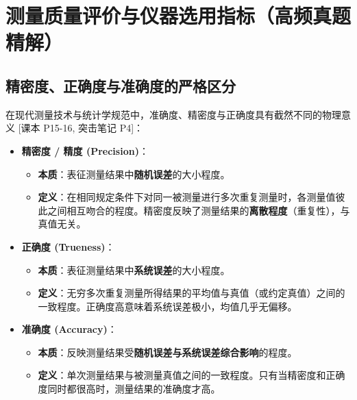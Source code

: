 \documentclass[11pt,a4paper]{ctexart}
\begin{document}
\newpage
\section{测量质量评价与仪器选用指标（高频真题精解）}

\subsection{精密度、正确度与准确度的严格区分}
在现代测量技术与统计学规范中，准确度、精密度与正确度具有截然不同的物理意义 \hfill\textsf{[课本 P15-16, 突击笔记 P4]}：

\begin{itemize}[leftmargin=1.5em, itemsep=4pt]
    \item \textbf{精密度 / 精度 (Precision)}：
    \begin{itemize}
        \item \textbf{本质}：表征测量结果中\textbf{随机误差}的大小程度。
        \item \textbf{定义}：在相同规定条件下对同一被测量进行多次重复测量时，各测量值彼此之间相互吻合的程度。精密度反映了测量结果的\textbf{离散程度}（重复性），与真值无关。
    \end{itemize}
    
    \item \textbf{正确度 (Trueness)}：
    \begin{itemize}
        \item \textbf{本质}：表征测量结果中\textbf{系统误差}的大小程度。
        \item \textbf{定义}：无穷多次重复测量所得结果的平均值与真值（或约定真值）之间的一致程度。正确度高意味着系统误差极小，均值几乎无偏移。
    \end{itemize}

    \item \textbf{准确度 (Accuracy)}：
    \begin{itemize}
        \item \textbf{本质}：反映测量结果受\textbf{随机误差与系统误差综合影响}的程度。
        \item \textbf{定义}：单次测量结果与被测量真值之间的一致程度。只有当精密度和正确度同时都很高时，测量结果的准确度才高。
    \end{itemize}
\end{itemize}
\end{document}

